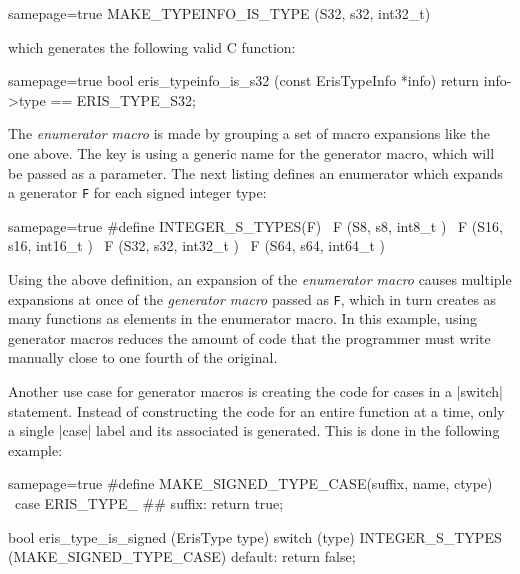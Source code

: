 \begin{ccode*}{samepage=true}
MAKE_TYPEINFO_IS_TYPE (S32, s32, int32_t)
\end{ccode*}

\noindent
which generates the following valid C function:

\begin{ccode*}{samepage=true}
  bool eris_typeinfo_is_s32 (const ErisTypeInfo *info)
  { return info->type == ERIS_TYPE_S32; }
\end{ccode*}

\noindent The \emph{enumerator macro} is made by grouping a set of macro
expansions like the one above. The key is using a generic name for the
generator macro, which will be passed as a parameter. The next listing defines
an enumerator which expands a generator \verb|F| for each signed integer type:

\begin{ccode*}{samepage=true}
#define INTEGER_S_TYPES(F) \
    F (S8,  s8,  int8_t  ) \
    F (S16, s16, int16_t ) \
    F (S32, s32, int32_t ) \
    F (S64, s64, int64_t )
\end{ccode*}

\noindent Using the above definition, an expansion of the \emph{enumerator
macro} causes multiple expansions at once of the \emph{generator macro} passed
as \verb|F|, which in turn creates as many functions as elements in the
enumerator macro. In this example, using generator macros reduces the amount
of code that the programmer must write manually close to one fourth of the
original.

Another use case for generator macros is creating the code for cases in
a \Mc|switch| statement. Instead of constructing the code for an entire
function at a time, only a single \Mc|case| label and its associated is
generated. This is done in the following example:

\begin{ccode*}{samepage=true}
#define MAKE_SIGNED_TYPE_CASE(suffix, name, ctype) \
    case ERIS_TYPE_ ## suffix: return true;

bool eris_type_is_signed (ErisType type) {
  switch (type) {
    INTEGER_S_TYPES (MAKE_SIGNED_TYPE_CASE)
    default: return false;
  }
}
\end{ccode*}

